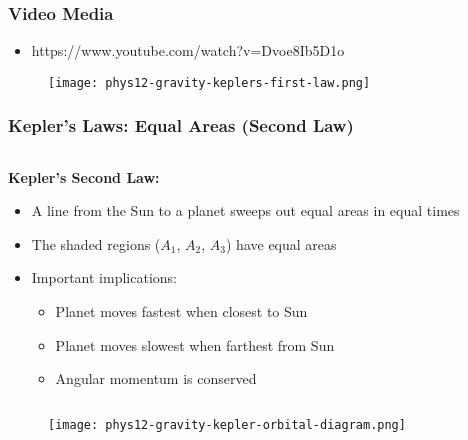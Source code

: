 \documentclass{beamer}
\begin{document}
\begin{frame}
\frametitle{Video Media}
\begin{itemize}
 \item https://www.youtube.com/watch?v=Dvoe8Ib5D1o
\end{itemize}
\end{frame}

\begin{frame}
\begin{figure}
    \centering
    \texttt{[image: phys12-gravity-keplers-first-law.png]}
\end{figure}
\end{frame}

\begin{frame}
\frametitle{Kepler's Laws: Equal Areas (Second Law)}
\begin{columns}
\begin{column}{0.6\textwidth}
\textbf{Kepler's Second Law:}
\begin{itemize}
    \item A line from the Sun to a planet sweeps out equal areas in equal times
    \item The shaded regions ($A_1$, $A_2$, $A_3$) have equal areas
    \item Important implications:
    \begin{itemize}
        \item Planet moves fastest when closest to Sun
        \item Planet moves slowest when farthest from Sun
        \item Angular momentum is conserved
    \end{itemize}
\end{itemize}
\end{column}
\begin{column}{0.4\textwidth}

\end{column}
\end{columns}
\end{frame}

\begin{frame}
\begin{figure}
    \centering
    \texttt{[image: phys12-gravity-kepler-orbital-diagram.png]}
\end{figure}
\end{frame}
\end{document}
